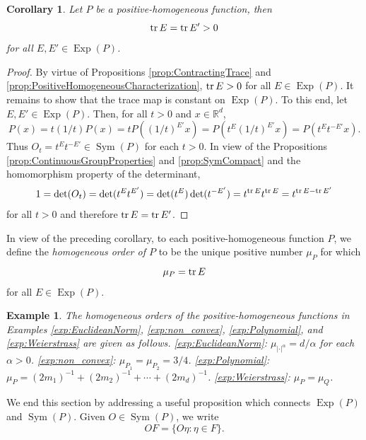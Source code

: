 \documentclass[11pt]{article}
\newtheorem{corollary}[theorem]{Corollary}
\newtheorem{example}{Example}
\newcommand\Sym{\operatorname{Sym}}
\newcommand\Exp{\operatorname{Exp}}
\renewcommand\det{\operatorname{det}}
\begin{document}
\begin{corollary}\label{cor:TraceisInvariant}
Let $P$ be a positive-homogeneous function, then
\begin{equation*}
\tr E=\tr E'>0
\end{equation*}
for all $E,E'\in\Exp(P)$.
\end{corollary}
\begin{proof}
By virtue of Propositions \ref{prop:ContractingTrace} and \ref{prop:PositiveHomogeneousCharacterization}, $\tr E>0$ for all $E\in\Exp(P)$. It remains to show that the trace map is constant on $\Exp(P)$. To this end, let $E,E'\in\Exp(P)$. Then, for all $t>0$ and $x\in\mathbb{R}^d$,
\begin{equation*}
P(x)=t(1/t)P(x)=tP((1/t)^{E'}x)=P(t^E(1/t)^{E'}x)=P(t^{E}t^{-E'}x).
\end{equation*}
Thus $O_t=t^{E}t^{-E'}\in\Sym(P)$ for each $t>0$. In view of the Propositions \ref{prop:ContinuousGroupProperties} and \ref{prop:SymCompact} and the homomorphism property of the determinant,
\begin{equation*}
1=\det(O_t)=\det(t^{E}t^{E'})=\det(t^{E})\det(t^{-E'})=t^{\tr E}t^{\tr E}=t^{\tr E-\tr E'}
\end{equation*}
for all $t>0$ and therefore $\tr E=\tr E'$.
\end{proof}

\noindent In view of the preceding corollary, to each positive-homogeneous function $P$, we define the \textit{homogeneous order of $P$} to be the unique positive number $\mu_P$ for which
\begin{equation*}
\mu_P=\tr E
\end{equation*}
for all $E\in\Exp(P)$. 

\begin{example}\normalfont The homogeneous orders of the positive-homogeneous functions in Examples \ref{exp:EuclideanNorm}, \ref{exp:non_convex}, \ref{exp:Polynomial}, and \ref{exp:Weierstrass} are given as follows. \ref{exp:EuclideanNorm}: $\mu_{|\cdot|^{\alpha}}=d/\alpha$ for each $\alpha>0$. \ref{exp:non_convex}: $\mu_{P_1}=\mu_{P_2}=3/4$. \ref{exp:Polynomial}: $\mu_P=(2m_1)^{-1}+(2m_2)^{-1}+\cdots+(2m_d)^{-1}$. \ref{exp:Weierstrass}: $\mu_P=\mu_Q$.
\end{example}


\noindent We end this section by addressing a useful proposition which connects $\Exp(P)$ and $\Sym(P)$. Given $O\in\Sym(P)$, we write
\begin{equation*}
    OF=\{O\eta:\eta\in F\}.
\end{equation*}
\end{document}
